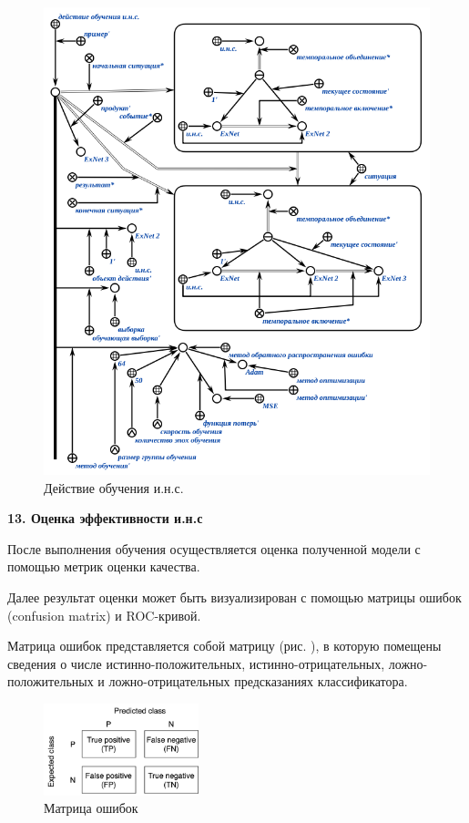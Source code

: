 \begin{figure}[H]
	\centering
	\includegraphics[scale=0.7]{author/part3/figures/ann_training_nn_scg.png}
	\caption{Действие обучения и.н.с.}
	\label{fig:ann_training_nn_scg}
\end{figure}

\textbf{13. Оценка эффективности и.н.с}

После выполнения обучения осуществляется оценка полученной модели с помощью метрик оценки качества.

Далее результат оценки может быть визуализирован с помощью матрицы ошибок (confusion matrix) и ROC-кривой.

Матрица ошибок представляется собой матрицу (рис. ), в которую помещены сведения о числе истинно-положительных, истинно-отрицательных, ложно-положительных и ложно-отрицательных предсказаниях классификатора.

\begin{figure}[h]
	\centering
	\includegraphics[width=0.4\textwidth]{author/part3/figures/conf_matrix.png}
	\caption{Матрица ошибок}
	\label{fig:conf_matrix}
\end{figure}

